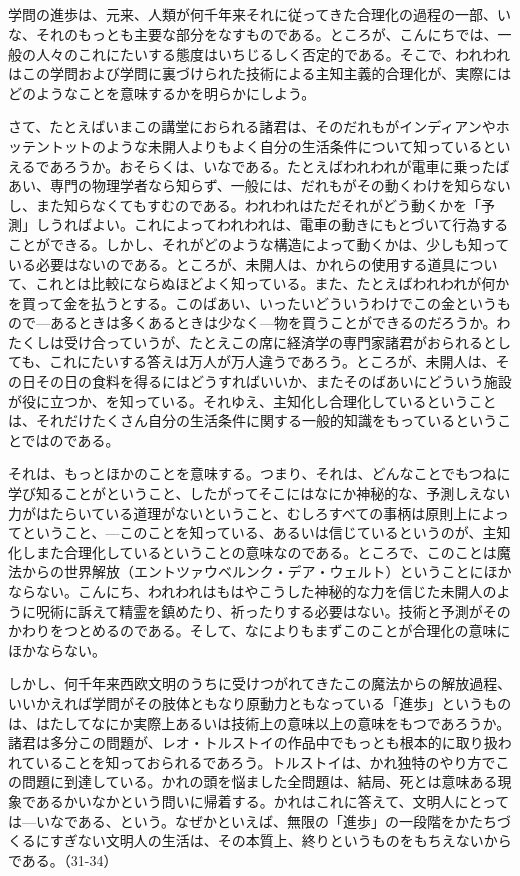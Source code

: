 \subsection{}


学問の進歩は、元来、人類が何千年来それに従ってきた合理化の過程の一部、いな、それのもっとも主要な部分をなすものである。ところが、こんにちでは、一般の人々のこれにたいする態度はいちじるしく否定的である。そこで、われわれはこの学問および学問に裏づけられた技術による主知主義的合理化が、実際にはどのようなことを意味するかを明らかにしよう。

さて、たとえばいまこの講堂におられる諸君は、そのだれもがインディアンやホッテントットのような未開人よりもよく自分の生活条件について知っているといえるであろうか。おそらくは、いなである。たとえばわれわれが電車に乗ったばあい、専門の物理学者なら知らず、一般には、だれもがその動くわけを知らないし、また知らなくてもすむのである。われわれはただそれがどう動くかを「予測」しうればよい。これによってわれわれは、電車の動きにもとづいて行為することができる。しかし、それがどのような構造によって動くかは、少しも知っている必要はないのである。ところが、未開人は、かれらの使用する道具について、これとは比較にならぬほどよく知っている。また、たとえばわれわれが何かを買って金を払うとする。このばあい、いったいどういうわけでこの金というもので{\——}あるときは多くあるときは少なく{\——}物を買うことができるのだろうか。わたくしは受け合っていうが、たとえこの席に経済学の専門家諸君がおられるとしても、これにたいする答えは万人が万人違うであろう。ところが、未開人は、その日その日の食料を得るにはどうすればいいか、またそのばあいにどういう施設が役に立つか、を知っている。それゆえ、主知化し合理化しているということは、それだけたくさん自分の生活条件に関する一般的知識をもっているということではのである。

それは、もっとほかのことを意味する。つまり、それは、どんなことでもつねに学び知ることがということ、したがってそこにはなにか神秘的な、予測しえない力がはたらいている道理がないということ、むしろすべての事柄は原則上によってということ、{\——}このことを知っている、あるいは信じているというのが、主知化しまた合理化しているということの意味なのである。ところで、このことは魔法からの世界解放（エントツァウベルンク・デア・ウェルト）ということにほかならない。こんにち、われわれはもはやこうした神秘的な力を信じた未開人のように呪術に訴えて精霊を鎮めたり、祈ったりする必要はない。技術と予測がそのかわりをつとめるのである。そして、なによりもまずこのことが合理化の意味にほかならない。

しかし、何千年来西欧文明のうちに受けつがれてきたこの魔法からの解放過程、いいかえれば学問がその肢体ともなり原動力ともなっている「進歩」というものは、はたしてなにか実際上あるいは技術上の意味以上の意味をもつであろうか。諸君は多分この問題が、レオ・トルストイの作品中でもっとも根本的に取り扱われていることを知っておられるであろう。トルストイは、かれ独特のやり方でこの問題に到達している。かれの頭を悩ました全問題は、結局、死とは意味ある現象であるかいなかという問いに帰着する。かれはこれに答えて、文明人にとっては{\——}いなである、という。なぜかといえば、無限の「進歩」の一段階をかたちづくるにすぎない文明人の生活は、その本質上、終りというものをもちえないからである。（31-34）

